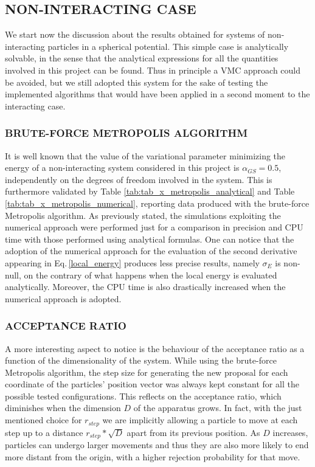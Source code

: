 \subsection{NON-INTERACTING CASE}
We start now the discussion about the results obtained for systems of non-interacting particles in a spherical potential. This simple case is analytically solvable, in the sense that the analytical expressions for all the quantities involved in this project can be found. Thus in principle a VMC approach could be avoided, but we still adopted this system for the sake of testing the implemented algorithms that would have been applied in a second moment to the interacting case. 

\subsubsection*{BRUTE-FORCE METROPOLIS ALGORITHM}
It is well known that the value of the variational parameter minimizing the energy of a non-interacting system considered in this project is $\alpha_{GS}=0.5$, independently on the degrees of freedom involved in the system. This is furthermore validated by Table \ref{tab:tab_x_metropolis_analytical} and Table \ref{tab:tab_x_metropolis_numerical}, reporting data produced with the brute-force Metropolis algorithm. As previously stated, the simulations exploiting the numerical approach were performed just for a comparison in precision and CPU time with those performed using analytical formulas. One can notice that the adoption of the numerical approach for the evaluation of the second derivative appearing in Eq.\,\ref{local_energy} produces less precise results, namely $\sigma_E$ is non-null, on the contrary of what happens when the local energy is evaluated analytically. Moreover, the CPU time is also drastically increased when the numerical approach is adopted. 

\subsubsection*{ACCEPTANCE RATIO}
A more interesting aspect to notice is the behaviour of the acceptance ratio as a function of the dimensionality of the system. While using the brute-force Metropolis algorithm, the step size for generating the new proposal for each coordinate of the particles' position vector was always kept constant for all the possible tested configurations. This reflects on the acceptance ratio, which diminishes when the dimension $D$ of the apparatus grows. In fact, with the just mentioned choice for $r_{step}$ we are implicitly allowing a particle to move at each step up to a distance $r_{step} \ast \sqrt{D}$ apart from its previous position. As $D$ increases, particles can undergo larger movements and thus they are also more likely to end more distant from the origin, with a higher rejection probability for that move. \\

